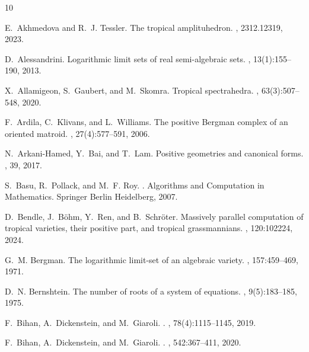 \documentclass{article}
\theoremstyle{definition}
\begin{document}
{\small
%
%
\begin{thebibliography}{10}

E.~Akhmedova and R.~J. Tessler.
\newblock The tropical amplituhedron.
, 2312.12319, 2023.

D.~Alessandrini.
\newblock Logarithmic limit sets of real semi-algebraic sets.
, 13(1):155--190, 2013.

X.~Allamigeon, S.~Gaubert, and M.~Skomra.
\newblock Tropical spectrahedra.
, 63(3):507--548, 2020.

F.~Ardila, C.~Klivans, and L.~Williams.
\newblock The positive {B}ergman complex of an oriented matroid.
, 27(4):577--591, 2006.

N.~Arkani-Hamed, Y.~Bai, and T.~Lam.
\newblock Positive geometries and canonical forms.
, 39, 2017.

S.~Basu, R.~Pollack, and M.~F. Roy.
.
\newblock Algorithms and Computation in Mathematics. Springer Berlin Heidelberg, 2007.

D.~Bendle, J.~Böhm, Y.~Ren, and B.~Schröter.
\newblock Massively parallel computation of tropical varieties, their positive part, and tropical grassmannians.
, 120:102224, 2024.

G.~M. Bergman.
\newblock The logarithmic limit-set of an algebraic variety.
, 157:459--469, 1971.

D.~N. Bernshtein.
\newblock The number of roots of a system of equations.
, 9(5):183–185, 1975.

F.~Bihan, A.~Dickenstein, and M.~Giaroli.
.
, 78(4):1115--1145, 2019.

F.~Bihan, A.~Dickenstein, and M.~Giaroli.
.
, 542:367--411, 2020.


\end{thebibliography}}
\end{document}
